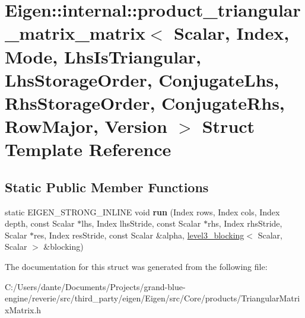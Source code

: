 \hypertarget{struct_eigen_1_1internal_1_1product__triangular__matrix__matrix_3_01_scalar_00_01_index_00_01_moa7595ecc6fa7617b9a7dfbf733dbf94b}{}\section{Eigen\+::internal\+::product\+\_\+triangular\+\_\+matrix\+\_\+matrix$<$ Scalar, Index, Mode, Lhs\+Is\+Triangular, Lhs\+Storage\+Order, Conjugate\+Lhs, Rhs\+Storage\+Order, Conjugate\+Rhs, Row\+Major, Version $>$ Struct Template Reference}
\label{struct_eigen_1_1internal_1_1product__triangular__matrix__matrix_3_01_scalar_00_01_index_00_01_moa7595ecc6fa7617b9a7dfbf733dbf94b}
\subsection*{Static Public Member Functions}
\begin{DoxyCompactItemize}
\item 
\mbox{\label{struct_eigen_1_1internal_1_1product__triangular__matrix__matrix_3_01_scalar_00_01_index_00_01_moa7595ecc6fa7617b9a7dfbf733dbf94b_a9322956d1262bb73351b6e78e39bbfea}} 
static E\+I\+G\+E\+N\+\_\+\+S\+T\+R\+O\+N\+G\+\_\+\+I\+N\+L\+I\+NE void {\bfseries run} (Index rows, Index cols, Index depth, const Scalar $\ast$lhs, Index lhs\+Stride, const Scalar $\ast$rhs, Index rhs\+Stride, Scalar $\ast$res, Index res\+Stride, const Scalar \&alpha, \mbox{\hyperlink{class_eigen_1_1internal_1_1level3__blocking}{level3\+\_\+blocking}}$<$ Scalar, Scalar $>$ \&blocking)
\end{DoxyCompactItemize}


The documentation for this struct was generated from the following file\+:\begin{DoxyCompactItemize}
\item 
C\+:/\+Users/dante/\+Documents/\+Projects/grand-\/blue-\/engine/reverie/src/third\+\_\+party/eigen/\+Eigen/src/\+Core/products/Triangular\+Matrix\+Matrix.\+h\end{DoxyCompactItemize}
